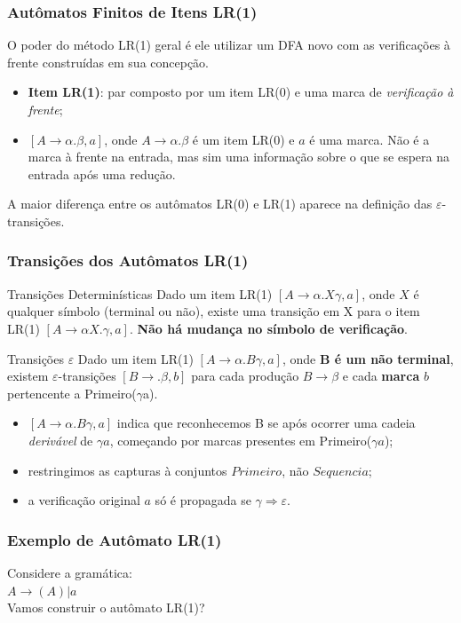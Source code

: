 \documentclass[table]{beamer}
\begin{document}
\begin{frame}
   \frametitle{Autômatos Finitos de Itens LR(1)}
   O poder do método LR(1) geral é ele utilizar um DFA novo com as verificações à frente construídas em sua concepção.
   \begin{itemize}
      \item \textbf{Item LR(1)}: par composto por um item LR(0) e uma marca de \textit{verificação à frente};
      \item $[A\to\alpha.\beta, a]$, onde $A\to\alpha.\beta$ é um item LR(0) e $a$ é uma marca. Não é a marca à frente na entrada, mas sim uma informação sobre o que se espera na entrada após uma redução.
   \end{itemize}
   A maior diferença entre os autômatos LR(0) e LR(1) aparece na definição das $\varepsilon$-transições.
\end{frame}

\begin{frame}
   \frametitle{Transições dos Autômatos LR(1)}
   \begin{block}{Transições Determinísticas}
   Dado um item LR(1) $[A\to\alpha.X\gamma,a]$, onde $X$ é qualquer símbolo (terminal ou não), existe uma transição em X para o item LR(1) $[A\to\alpha X.\gamma, a]$. \textbf{Não há mudança no símbolo de verificação}.
   \end{block}

   \begin{block}{Transições $\varepsilon$}
   Dado um item LR(1) $[A\to\alpha.B\gamma,a]$, onde \textbf{B é um não terminal}, existem $\varepsilon$-transições $[B\to.\beta, b]$ para cada produção $B \to \beta$ e cada \textbf{marca} $b$ pertencente a Primeiro($\gamma$a).
   \begin{itemize}
      \item $[A\to\alpha.B\gamma,a]$ indica que reconhecemos B se após ocorrer uma cadeia \textit{derivável} de $\gamma a$, começando por marcas presentes em Primeiro($\gamma a$);
      \item restringimos as capturas à conjuntos $Primeiro$, não $Sequencia$;
      \item a verificação original $a$ só é propagada se $\gamma \Rightarrow \varepsilon$.
   \end{itemize}
   \end{block}
\end{frame}

\begin{frame}
   \frametitle{Exemplo de Autômato LR(1)}
   Considere a gramática: \\
   $A\to(A)|a$ \\
   Vamos construir o autômato LR(1)?
\end{frame}
\end{document}
